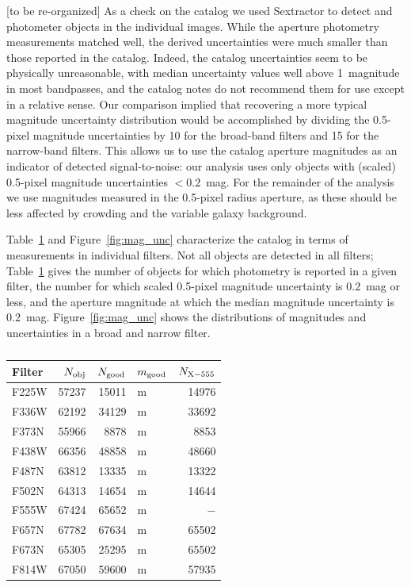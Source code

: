 [to be re-organized] As a check on the catalog we used Sextractor to detect and photometer objects in the individual images.
While the aperture photometry measurements matched well, the derived uncertainties were much smaller than those reported in the catalog.
Indeed, the catalog uncertainties seem to be physically unreasonable, with median uncertainty values well above 1~magnitude in
most bandpasses, and the catalog notes do not recommend them for use except in a relative sense.
Our comparison implied that recovering a more typical magnitude uncertainty distribution would be accomplished by
dividing the 0.5-pixel magnitude uncertainties  by 10 for the broad-band filters and 15 for the narrow-band filters.
This allows us to use the catalog aperture magnitudes as an indicator of detected signal-to-noise: our analysis uses only objects with
(scaled) 0.5-pixel magnitude uncertainties $<0.2$~mag.
For the remainder of the analysis we use magnitudes measured in the 0.5-pixel radius aperture, as these should be less affected
by crowding and the variable galaxy background.

Table~\ref{tab:cat_numbers} and Figure~\ref{fig:mag_unc} characterize the catalog in terms of measurements in individual filters.
Not all objects are detected in all filters;
Table~\ref{tab:cat_numbers} gives the number of objects for which photometry is reported in a given filter,
the number for which scaled 0.5-pixel magnitude uncertainty is $0.2$~mag or less,
and the aperture magnitude at which the median magnitude uncertainty is $0.2$~mag. %
Figure~\ref{fig:mag_unc} shows the distributions of magnitudes and uncertainties in a broad and narrow filter. %

\begin{table}
\centering
\caption{
\label{tab:cat_numbers}}
\begin{tabular}{lrrlr}
\hline\hline
Filter & $N_{\rm obj}$ & $N_{\rm good}$ & $m_{\rm good}$ & $N_{\rm X-555}$\\
\hline
F225W &  57237 & 15011 & m & 14976\\
F336W &  62192 & 34129 & m & 33692\\
F373N &  55966 & 8878 & m & 8853\\
F438W &  66356 & 48858 & m & 48660\\
F487N &  63812 & 13335 & m & 13322\\
F502N &  64313 & 14654 & m & 14644\\
F555W &  67424 & 65652 & m & $-$\\
F657N &  67782 & 67634 & m & 65502\\
F673N &  65305 & 25295 & m & 65502\\
F814W &  67050 & 59600 & m & 57935\\
\hline
\end{tabular}
\end{table}

